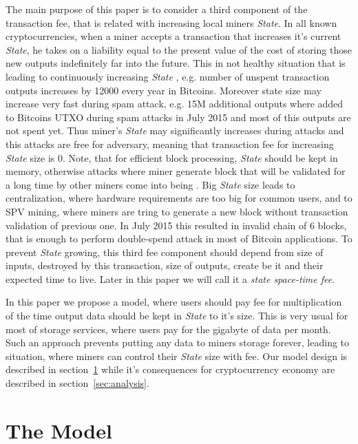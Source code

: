 \documentclass[]{article}   %
\newcommand{\authnote}[2]{\marginpar{\parbox{\marginparwidth}{\tiny %
  \textsf{#1 {\textcolor{blue}{notes: #2}}}}}%
  \textcolor{blue}{\textbf{\dag}}}
\newcommand{\authnote}[2]{
  \textsf{#1 \textcolor{blue}{: #2}}}
\newcommand{\authnote}[2]{}
\newcommand{\dnote}[1]{{\authnote{\textcolor{blue}{Dima notes}}{#1}}}
\newcommand{\state}{\textit{State}}
\begin{document}
The main purpose of this paper is to consider a third component of the transaction fee, that is related with increasing local miners \state{}. In all known cryptocurrencies, when a miner accepts a transaction that increases it's current \state{}, he takes on a liability equal to the present value of the cost of storing those new outputs indefinitely far into the future. This in not healthy situation that is leading to continuously increasing \state{} \cite{utxoChart}, e.g. number of unspent transaction outputs increases by 12000 every year in Bitcoins. Moreover state size may increase very fast during spam attack, e.g. 15M additional outputs where added to Bitcoins UTXO during spam attacks in July 2015 \cite{bitcoin2015flood} and most of this outputs are not spent yet. Thus miner's \state{} may significantly increases during attacks and this attacks are free for adversary, meaning that transaction fee for increasing \state{} size is 0. Note, that for efficient block processing, \state{} should be kept in memory, otherwise attacks where miner generate block that will be validated for a long time by other miners come into being \dnote{link to ethereum DoS, + others?}. Big \state{} size leads to centralization, where hardware requirements are too big for common users, and to SPV mining, where miners are tring to generate a new block without transaction validation of previous one. In July 2015 this resulted in invalid chain of 6 blocks\cite{spvMining}, that is enough to perform double-spend attack in most of Bitcoin applications. To prevent \state{} growing, this third fee component should depend from size of inputs, destroyed by this transaction, size of outputs, create be it and their expected time to live. Later in this paper we will call it a \textit{state space-time fee}.

In this paper we propose a model, where users should pay fee for multiplication of the time output data should be kept in \state{} to it's size. This is very usual for most of storage services, where users pay for the gigabyte of data per month. Such an approach prevents putting any data to miners storage forever, leading to situation, where miners can control their \state{} size with fee. Our model design is described in section~\ref{sec:model} while it's consequences for cryptocurrency economy are described in section~\ref{sec:analysis}.  \dnote{paper structure}

\dnote{write somewhere about lost coins and deflation}

\section{The Model}
\label{sec:model}
\end{document}
